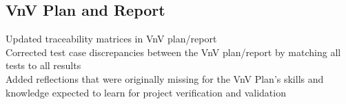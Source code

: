 \documentclass[12pt]{article}
\begin{document}
\subsection{VnV Plan and Report}

Updated traceability matrices in VnV plan/report \\

Corrected test case discrepancies between the VnV plan/report by matching all tests to all results \\

Added reflections that were originally missing for the VnV Plan’s skills and knowledge expected to learn for project verification and validation \\






\end{document}
